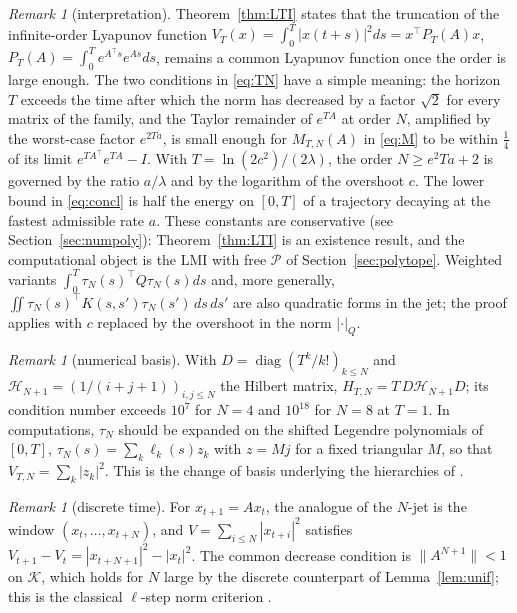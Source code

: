 \documentclass[preprint,12pt,authoryear]{elsarticle}
\theoremstyle{definition}
\theoremstyle{remark}
\newtheorem{remark}[theorem]{Remark}
\newcommand{\tr}{^{\top}}
\newcommand{\PP}{\mathcal{P}}
\newcommand{\KK}{\mathcal{K}}
\DeclareMathOperator{\diag}{diag}
\begin{document}
\begin{remark}[interpretation]\label{rem:interp}
Theorem~\ref{thm:LTI} states that the truncation of the infinite-order Lyapunov function $V_T(x)=\int_0^T|x(t+s)|^2ds=x\tr P_T(A)x$, $P_T(A)=\int_0^Te^{A\tr s}e^{As}ds$, remains a common Lyapunov function once the order is large enough. The two conditions in \eqref{eq:TN} have a simple meaning: the horizon $T$ exceeds the time after which the norm has decreased by a factor $\sqrt2$ for every matrix of the family, and the Taylor remainder of $e^{TA}$ at order $N$, amplified by the worst-case factor $e^{2Ta}$, is small enough for $M_{T,N}(A)$ in \eqref{eq:M} to be within $\frac14$ of its limit $e^{TA\tr}e^{TA}-I$. With $T=\ln(2c^2)/(2\lambda)$, the order $N\ge e^2Ta+2$ is governed by the ratio $a/\lambda$ and by the logarithm of the overshoot $c$. The lower bound in \eqref{eq:concl} is half the energy on $[0,T]$ of a trajectory decaying at the fastest admissible rate $a$. These constants are conservative (see Section~\ref{sec:numpoly}): Theorem~\ref{thm:LTI} is an existence result, and the computational object is the LMI with free $\PP$ of Section~\ref{sec:polytope}. Weighted variants $\int_0^T\tau_N(s)\tr Q\tau_N(s)ds$ and, more generally, $\iint\tau_N(s)\tr K(s,s')\tau_N(s')\,ds\,ds'$ are also quadratic forms in the jet; the proof applies with $c$ replaced by the overshoot in the norm $|\cdot|_Q$.
\end{remark}

\begin{remark}[numerical basis]\label{rem:legendre}
With $D=\diag(T^k/k!)_{k\le N}$ and $\mathcal H_{N+1}=(1/(i+j+1))_{i,j\le N}$ the Hilbert matrix, $H_{T,N}=T\,D\mathcal H_{N+1}D$; its condition number exceeds $10^7$ for $N=4$ and $10^{18}$ for $N=8$ at $T=1$. In computations, $\tau_N$ should be expanded on the shifted Legendre polynomials of $[0,T]$, $\tau_N(s)=\sum_k\ell_k(s)z_k$ with $z=Mj$ for a fixed triangular $M$, so that $V_{T,N}=\sum_k|z_k|^2$. This is the change of basis underlying the hierarchies of \citet{SeuretGouaisbaut2015}.
\end{remark}

\begin{remark}[discrete time]
For $x_{t+1}=Ax_t$, the analogue of the $N$-jet is the window $(x_t,\dots,x_{t+N})$, and $V=\sum_{i\le N}|x_{t+i}|^2$ satisfies $V_{t+1}-V_t=|x_{t+N+1}|^2-|x_t|^2$. The common decrease condition is $\|A^{N+1}\|<1$ on $\KK$, which holds for $N$ large by the discrete counterpart of Lemma~\ref{lem:unif}; this is the classical $\ell$-step norm criterion \citep{Ahmadi2014}.
\end{remark}
\end{document}
